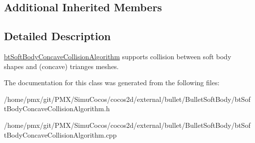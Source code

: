 \subsection*{Additional Inherited Members}


\subsection{Detailed Description}
\hyperlink{classbtSoftBodyConcaveCollisionAlgorithm}{bt\+Soft\+Body\+Concave\+Collision\+Algorithm} supports collision between soft body shapes and (concave) trianges meshes. 

The documentation for this class was generated from the following files\+:\begin{DoxyCompactItemize}
\item 
/home/pmx/git/\+P\+M\+X/\+Simu\+Cocos/cocos2d/external/bullet/\+Bullet\+Soft\+Body/bt\+Soft\+Body\+Concave\+Collision\+Algorithm.\+h\item 
/home/pmx/git/\+P\+M\+X/\+Simu\+Cocos/cocos2d/external/bullet/\+Bullet\+Soft\+Body/bt\+Soft\+Body\+Concave\+Collision\+Algorithm.\+cpp\end{DoxyCompactItemize}
